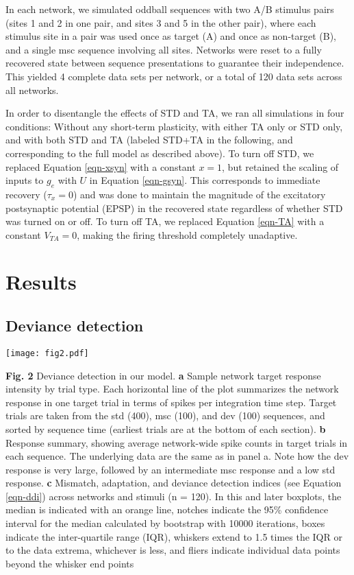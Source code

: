 \documentclass[pdflatex,referee,iicol,sn-basic]{sn-jnl}
\theoremstyle{thmstyleone}%
\theoremstyle{thmstyletwo}%
\theoremstyle{thmstylethree}%
\begin{document}
In each network, we simulated oddball sequences with two A/B stimulus pairs (sites 1 and 2 in one pair, and sites 3 and 5 in the other pair), where each stimulus site in a pair was used once as target (A) and once as non-target (B), and a single msc sequence involving all sites. Networks were reset to a fully recovered state between sequence presentations to guarantee their independence. This yielded 4 complete data sets per network, or a total of 120 data sets across all networks.

In order to disentangle the effects of STD and TA, we ran all simulations in four conditions: Without any short-term plasticity, with either TA only or STD only, and with both STD and TA (labeled STD+TA in the following, and corresponding to the full model as described above). To turn off STD, we replaced Equation \ref{eqn-xsyn} with a constant $x = 1$, but retained the scaling of inputs to $g_e$ with $U$ in Equation \ref{eqn-gsyn}. This corresponds to immediate recovery ($\tau_x = 0$) and was done to maintain the magnitude of the excitatory postsynaptic potential (EPSP) in the recovered state regardless of whether STD was turned on or off. To turn off TA, we replaced Equation \ref{eqn-TA} with a constant $V_{TA} = 0$, making the firing threshold completely unadaptive.

\section{Results}\label{sec-results}

\subsection{Deviance detection}\label{sec-dd}

\begin{figure*}%
    \centering
    \texttt{[image: fig2.pdf]}
    \caption{}
    \label{fig2}
\end{figure*}
\textbf{Fig. 2} Deviance detection in our model. \textbf{a} Sample network target response intensity by trial type. Each horizontal line of the plot summarizes the network response in one target trial in terms of spikes per integration time step. Target trials are taken from the std (400), msc (100), and dev (100) sequences, and sorted by sequence time (earliest trials are at the bottom of each section). \textbf{b} Response summary, showing average network-wide spike counts in target trials in each sequence. The underlying data are the same as in panel a. Note how the dev response is very large, followed by an intermediate msc response and a low std response. \textbf{c} Mismatch, adaptation, and deviance detection indices (see Equation \ref{eqn-ddi}) across networks and stimuli (n = 120). In this and later boxplots, the median is indicated with an orange line, notches indicate the 95\% confidence interval for the median calculated by bootstrap with 10000 iterations, boxes indicate the inter-quartile range (IQR), whiskers extend to 1.5 times the IQR or to the data extrema, whichever is less, and fliers indicate individual data points beyond the whisker end points
\end{document}
